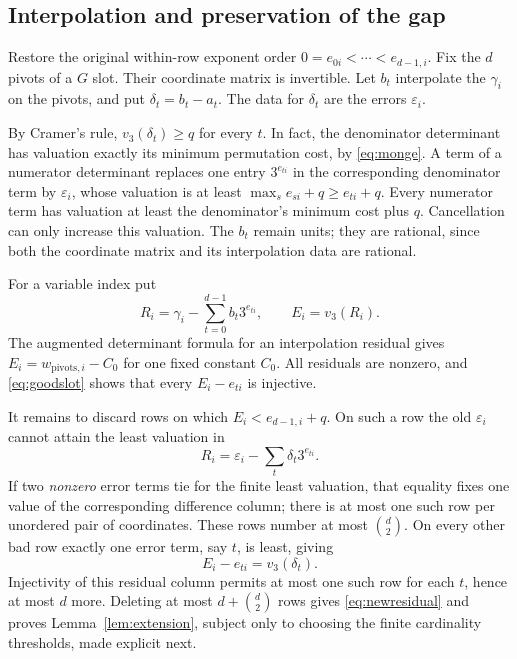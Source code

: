 \documentclass[11pt]{article}
\theoremstyle{definition}
\theoremstyle{remark}
\newcommand{\val}{v_3}
\begin{document}
\subsection{Interpolation and preservation of the gap}
Restore the original within-row exponent order
$0=e_{0i}<\cdots<e_{d-1,i}$. Fix the $d$ pivots of a $G$ slot.
Their coordinate matrix is invertible. Let $b_t$ interpolate the
$\gamma_i$ on the pivots, and put $\delta_t=b_t-a_t$. The data for
$\delta_t$ are the errors $\varepsilon_i$.

By Cramer's rule, $\val(\delta_t)\ge q$ for every $t$. In fact, the
denominator determinant has valuation exactly its minimum permutation
cost, by \eqref{eq:monge}. A term of a numerator determinant replaces
one entry $3^{e_{ti}}$ in the corresponding denominator term by
$\varepsilon_i$, whose valuation is at least
$\max_s e_{si}+q\ge e_{ti}+q$. Every numerator term has valuation at
least the denominator's minimum cost plus $q$. Cancellation can only
increase this valuation. The $b_t$ remain units; they are rational,
since both the coordinate matrix and its interpolation data are
rational.

For a variable index put
\[
 R_i=\gamma_i-\sum_{t=0}^{d-1}b_t3^{e_{ti}},\qquad E_i=\val(R_i).
\]
The augmented determinant formula for an interpolation residual gives
$E_i=w_{\text{pivots},i}-C_0$ for one fixed constant $C_0$.
All residuals are nonzero, and \eqref{eq:goodslot} shows that every
$E_i-e_{ti}$ is injective.

It remains to discard rows on which $E_i<e_{d-1,i}+q$. On such a row
the old $\varepsilon_i$ cannot attain the least valuation in
\[
 R_i=\varepsilon_i-\sum_t\delta_t3^{e_{ti}}.
\]
If two \emph{nonzero} error terms tie for the finite least valuation,
that equality fixes one value of the corresponding difference column;
there is at most one such row per unordered pair of coordinates.
These rows number at most $\binom d2$. On every other bad row exactly
one error term, say $t$, is least, giving
\[
 E_i-e_{ti}=\val(\delta_t).
\]
Injectivity of this residual column permits at most one such row for
each $t$, hence at most $d$ more. Deleting at most
$d+\binom d2$ rows gives \eqref{eq:newresidual} and proves
Lemma~\ref{lem:extension}, subject only to choosing the finite
cardinality thresholds, made explicit next.
\end{document}
